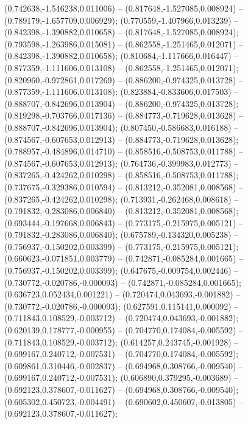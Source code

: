  (0.742638,-1.546238,0.011006) -- (0.817648,-1.527085,0.008924) -- (0.789179,-1.657709,0.006929);
 (0.770559,-1.407966,0.013239) -- (0.842398,-1.390882,0.010658) -- (0.817648,-1.527085,0.008924);
 (0.793598,-1.263986,0.015081) -- (0.862558,-1.251465,0.012071) -- (0.842398,-1.390882,0.010658);
 (0.810684,-1.117666,0.016447) -- (0.877359,-1.111606,0.013108) -- (0.862558,-1.251465,0.012071);
 (0.820960,-0.972861,0.017269) -- (0.886200,-0.974325,0.013728) -- (0.877359,-1.111606,0.013108);
 (0.823884,-0.833606,0.017503) -- (0.888707,-0.842696,0.013904) -- (0.886200,-0.974325,0.013728);
 (0.819298,-0.703766,0.017136) -- (0.884773,-0.719628,0.013628) -- (0.888707,-0.842696,0.013904);
 (0.807450,-0.586683,0.016188) -- (0.874567,-0.607653,0.012913) -- (0.884773,-0.719628,0.013628);
 (0.788957,-0.484896,0.014710) -- (0.858516,-0.508753,0.011788) -- (0.874567,-0.607653,0.012913);
 (0.764736,-0.399983,0.012773) -- (0.837265,-0.424262,0.010298) -- (0.858516,-0.508753,0.011788);
 (0.737675,-0.329386,0.010594) -- (0.813212,-0.352081,0.008568) -- (0.837265,-0.424262,0.010298);
 (0.713931,-0.262468,0.008618) -- (0.791832,-0.283086,0.006840) -- (0.813212,-0.352081,0.008568);
 (0.693444,-0.197668,0.006843) -- (0.773175,-0.215975,0.005121) -- (0.791832,-0.283086,0.006840);
 (0.675789,-0.134320,0.005238) -- (0.756937,-0.150202,0.003399) -- (0.773175,-0.215975,0.005121);
 (0.660623,-0.071851,0.003779) -- (0.742871,-0.085284,0.001665) -- (0.756937,-0.150202,0.003399);
 (0.647675,-0.009754,0.002446) -- (0.730772,-0.020786,-0.000093) -- (0.742871,-0.085284,0.001665);
 (0.636723,0.052434,0.001221) -- (0.720474,0.043693,-0.001882) -- (0.730772,-0.020786,-0.000093);
 (0.627591,0.115141,0.000092) -- (0.711843,0.108529,-0.003712) -- (0.720474,0.043693,-0.001882);
 (0.620139,0.178777,-0.000955) -- (0.704770,0.174084,-0.005592) -- (0.711843,0.108529,-0.003712);
 (0.614257,0.243745,-0.001928) -- (0.699167,0.240712,-0.007531) -- (0.704770,0.174084,-0.005592);
 (0.609861,0.310446,-0.002837) -- (0.694968,0.308766,-0.009540) -- (0.699167,0.240712,-0.007531);
 (0.606890,0.379295,-0.003689) -- (0.692123,0.378607,-0.011627) -- (0.694968,0.308766,-0.009540);
 (0.605302,0.450723,-0.004491) -- (0.690602,0.450607,-0.013805) -- (0.692123,0.378607,-0.011627);
